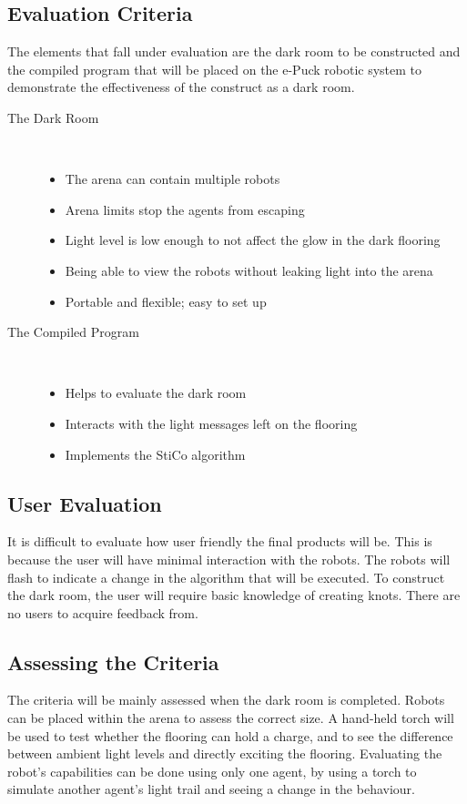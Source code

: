 \subsection{Evaluation Criteria} \label{desEvalCrit}
The elements that fall
under evaluation are the dark room to be constructed and the compiled program
that will be placed on the e-Puck robotic system to demonstrate the 
effectiveness of the construct as a dark room.

\begin{description}
  \item[The Dark Room] \hfill \\
  \begin{itemize}
    \item The arena can contain multiple robots
    \item Arena limits stop the agents from escaping
    \item Light level is low enough to not affect the glow in the dark flooring
    \item Being able to view the robots without leaking light into the arena
    \item Portable and flexible; easy to set up
  \end{itemize}
  \item[The Compiled Program] \hfill \\
  \begin{itemize}
    \item Helps to evaluate the dark room
    \item Interacts with the light messages left on the flooring
    \item Implements the StiCo algorithm
  \end{itemize}
\end{description}

\subsection{User Evaluation} \label{desEvalUser}
It is difficult to evaluate how user friendly the final products will be.  This
is because the user will have minimal interaction with the robots.  The robots
will flash to indicate a change in the algorithm that will be executed.  To
construct the dark room, the user will require basic knowledge of creating
knots.  There are no users to acquire feedback from.

\subsection{Assessing the Criteria} \label{desEvalAss}
The criteria will be mainly assessed when the dark room is completed.  Robots
can be placed within the arena to assess the correct size.  A hand-held torch
will be used to test whether the flooring can hold a charge, and to see the
difference between ambient light levels and directly exciting the flooring.
Evaluating the robot's capabilities can be done using only one agent, by using
a torch to simulate another agent's light trail and seeing a change in the
behaviour.


